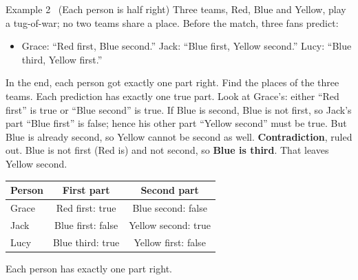 \begin{exbox}{Example 2 \ (Each person is half right)}
Three teams, Red, Blue and Yellow, play a tug-of-war; no two teams share a place. Before the match, three fans predict:
\begin{itemize}[leftmargin=1.4em,itemsep=0pt,topsep=2pt]
\item Grace: ``Red first, Blue second.'' \quad Jack: ``Blue first, Yellow second.'' \quad Lucy: ``Blue third, Yellow first.''
\end{itemize}
In the end, each person got exactly one part right. Find the places of the three teams.
\guide
{}
Each prediction has exactly one true part. Look at Grace's: either ``Red first'' is true or ``Blue second'' is true.
If Blue is second, Blue is not first, so Jack's part ``Blue first'' is false; hence his other part ``Yellow second'' must be true. But
Blue is already second, so Yellow cannot be second as well. \textbf{Contradiction}, ruled out.
Blue is not first (Red is) and not second, so \textbf{Blue is third}. That leaves Yellow second.
\begin{center}
\begin{tabular}{|l|c|c|}
\hline
\rowcolor{tmBlue!10} Person & First part & Second part \\ \hline
Grace & Red first: \textcolor{tmGreen!70!black}{true} & Blue second: \textcolor{AnsRed}{false} \\ \hline
Jack & Blue first: \textcolor{AnsRed}{false} & Yellow second: \textcolor{tmGreen!70!black}{true} \\ \hline
Lucy & Blue third: \textcolor{tmGreen!70!black}{true} & Yellow first: \textcolor{AnsRed}{false} \\ \hline
\end{tabular}
\end{center}
Each person has exactly one part right.
\end{exbox}

